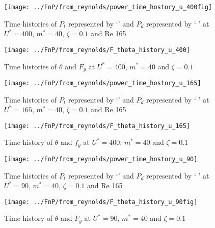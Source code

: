  \begin{figure}
 \centering
 \texttt{[image: ../FnP/from\_reynolds/power\_time\_hostory\_u\_400fig]}
 \caption{Time histories of  $P_t$  represented by `\protect\dashedrule' and $P_d$ represented by ` \solidrule[4mm]\hspace{1mm}' at $U^*=400$, $m^*=40$, $\zeta=0.1$ and Re 165 }  
 \label{fig:power_time_hostory_u_400fig}
 \end{figure}
 
 \begin{figure}
 \centering
 \texttt{[image: ../FnP/from\_reynolds/F\_theta\_history\_u\_400]}
 \caption{Time histories of $\theta$ and $F_y$ at $U^*=400$, $m^*=40$ and $\zeta=0.1$}
 \label{fig:F_theta_history_u_400}
 \end{figure}
 
 
 

  
  \begin{figure}
  \centering
  \texttt{[image: ../FnP/from\_reynolds/power\_time\_hostory\_u\_165]}
  \caption{Time histories of  $P_t$  represented by `\protect\dashedrule' and $P_d$ represented by ` \solidrule[4mm]\hspace{1mm}' at $U^*=165$, $m^*=40$, $\zeta=0.1$ and Re 165}
  \label{fig:power_time_hostory_u_165}
  \end{figure}
  
  \begin{figure}
  \centering
  \texttt{[image: ../FnP/from\_reynolds/F\_theta\_history\_u\_165]}
  \caption{Time history of $\theta$ and $f_y$ at $U^*=400$, $m^*=40$ and $\zeta=0.1$}
  \label{fig:F_theta_history_u_165}
  \end{figure}
 
 

 
  \begin{figure}
  \centering
  \texttt{[image: ../FnP/from\_reynolds/power\_time\_hostory\_u\_90]}
  \caption{Time histories of  $P_t$  represented by `\protect\dashedrule' and $P_d$ represented by ` \solidrule[4mm]\hspace{1mm}' at $U^*=90$, $m^*=40$, $\zeta=0.1$ and Re 165 }
  \label{fig:power_time_hostory_u_90}
  \end{figure}
  
  \begin{figure}
  \centering
  \texttt{[image: ../FnP/from\_reynolds/F\_theta\_history\_u\_90fig]}
  \caption{Time history of $\theta$ and $F_y$ at $U^*=90$, $m^*=40$ and $\zeta=0.1$}
  \label{fig:F_theta_history_u_90fig}
  \end{figure}
 
